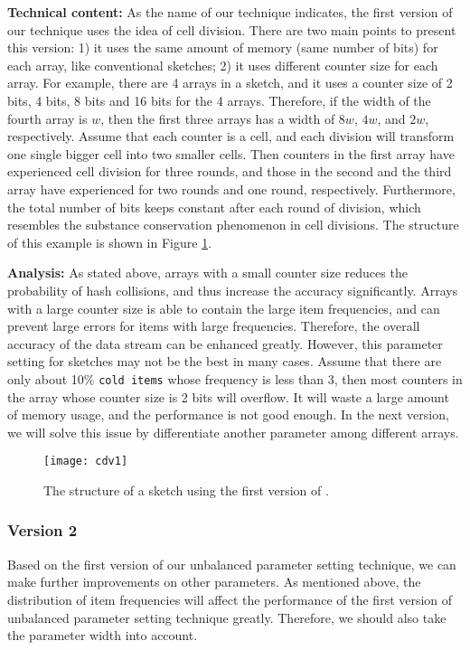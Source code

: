 \noindent\textbf{Technical content: }As the name of our technique indicates, the first version of our technique uses the idea of cell division.
There are two main points to present this version: 1) it uses the same amount of memory (same number of bits) for each array, like conventional sketches; 2) it uses different counter size for each array. For example, there are 4 arrays in a sketch, and it uses a counter size of 2 bits, 4 bits, 8 bits and 16 bits for the 4 arrays. Therefore, if the width of the fourth array is $w$, then the first three arrays has a width of $8w$, $4w$, and $2w$, respectively.
Assume that each counter is a cell, and each division will transform one single bigger cell into two smaller cells.
Then counters in the first array have experienced cell division for three rounds, and those in the second and the third array have experienced for two rounds and one round, respectively. Furthermore, the total number of bits keeps constant after each round of division, which resembles the substance conservation phenomenon in cell divisions.
The structure of this example is shown in Figure \ref{draw:version1}.

\noindent\textbf{Analysis: }As stated above, arrays with a small counter size reduces the probability of hash collisions, and thus increase the accuracy significantly. Arrays with a large counter size is able to contain the large item frequencies, and can prevent large errors for items with large frequencies. Therefore, the overall accuracy of the data stream can be enhanced greatly. However, this parameter setting for sketches may not be the best in many cases.
Assume that there are only about 10\% \texttt{cold items} whose frequency is less than 3, then most counters in the array whose counter size is 2 bits will overflow. It will waste a large amount of memory usage, and the performance is not good enough.
In the next version, we will solve this issue by differentiate another parameter among different arrays. 

\begin{figure}[htbp]
	\centering
	\texttt{[image: cdv1]}
	\caption{The structure of a sketch using the first version of \fname.} 
	\label{draw:version1}
\end{figure}

\presub
\subsubsection{Version 2} \postsub

Based on the first version of our unbalanced parameter setting technique, we can make further improvements on other parameters.
As mentioned above, the distribution of item frequencies will affect the performance of the first version of unbalanced parameter setting technique greatly.
Therefore, we should also take the parameter width into account.

